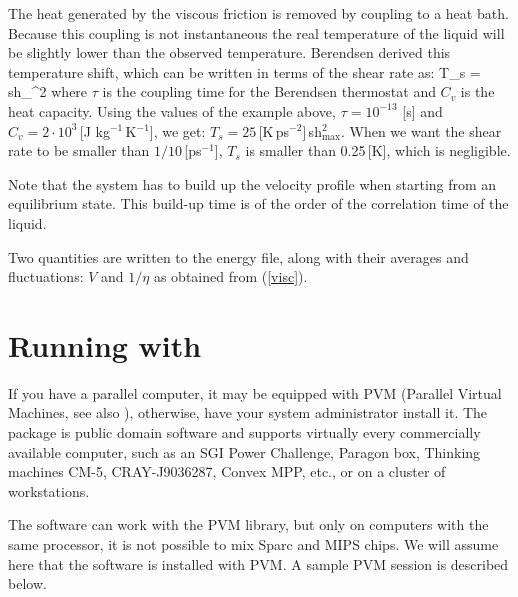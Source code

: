 The heat generated by the viscous friction is removed by coupling to a heat
bath. Because this coupling is not instantaneous the real temperature of the
liquid will be slightly lower than the observed temperature.
Berendsen derived this temperature shift\cite{Berendsen91}{,} which can
be written in terms of the shear rate as:
\beq
T_s =  \mbox{sh}_{\max}^2
\eeq
where $\tau$ is the coupling time for the Berendsen thermostat and
$C_v$ is the heat capacity. Using the values of the example above,
$\tau=10^{-13}$ [s] and $C_v=2 \cdot 10^3$\,[J kg$^{-1}$\,K$^{-1}$], we
get: $T_s=25$\,[K\,ps$^{-2}$]\,sh$_{\max}^2$. When we want the shear
rate to be smaller than $1/10$\,[ps$^{-1}$], $T_s$ is smaller than
0.25\,[K], which is negligible.

Note that the system has to build up the velocity profile when starting
from an equilibrium state. This build-up time is of the order of the
correlation time of the liquid.

Two quantities are written to the energy file, along with their averages
and fluctuations: $V$ and $1/\eta$ as obtained from (\ref{visc}).

\section{Running with }
If you have a parallel computer, it may be equipped with PVM (Parallel
Virtual Machines, see also ), otherwise,
have your system administrator install it. The package is public
domain software and supports virtually every commercially available
computer, such as an SGI Power Challenge, Paragon {\intel} box,
Thinking machines CM-5, CRAY-J9036287, Convex MPP, etc., or on a
cluster of workstations.

The {\gromacs} software can work with the PVM library, but only
on computers with the same processor, it is not possible to mix
{\eg} Sparc and MIPS chips. We will assume
here that the software is installed with PVM. A sample PVM session
is described below.

